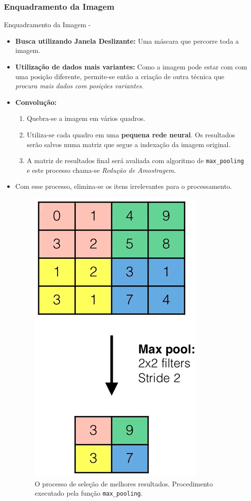 \documentclass[aspectratio=169, xcolor=dvipsnames]{beamer}
\let\olditem=\item%
\renewcommand{\item}{\olditem \justifying}
\begin{document}
	\subsubsection{Enquadramento da Imagem}
	\begin{frame}[allowframebreaks]{Enquadramento da Imagem -}
		\begin{itemize}
			\setlength\itemsep{1.2em}
			\item \textbf{Busca utilizando Janela Deslizante:} Uma máscara que percorre toda a imagem.

			\item \textbf{Utilização de dados mais variantes:} Como a imagem pode estar com com uma posição diferente, permite-se então a criação de outra técnica que \textit{procura mais dados com posições variantes}.

			\item \textbf{Convolução:}
				\begin{enumerate}
					\setlength\itemsep{0.8em}
					\item Quebra-se a imagem em vários quadros.
					\item Utiliza-se cada quadro em uma \textbf{pequena rede neural}. Os resultados serão salvos numa matriz que segue a indexação da imagem original.
					\item A matriz de resultados final será avaliada com algoritmo de \texttt{max\_pooling} e este processo chama-se \textit{Redução de Amostragem}.
				\end{enumerate}

			\item Com esse processo, elimina-se os itens irrelevantes para o processamento.

			\begin{figure}[H]
				\centering
				\includegraphics[width=0.2\linewidth]{img/max_pooling.png}
				\caption{O processo de seleção de melhores resultados. Procedimento executado pela função \texttt{max\_pooling}.}
				\label{fig:max_pooling.png}
			\end{figure}


\end{itemize}
\end{frame}
\end{document}
